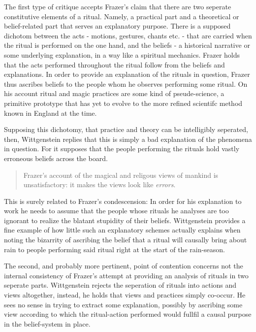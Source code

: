 \documentclass{article}
\begin{document}
The first type of critique accepts Frazer's claim that there are two seperate constitutive elements of a ritual. Namely, a practical part and a theoretical or belief-related part that serves an explanatory purpose. There is a supposed dichotom between the acts - motions, gestures, chants etc. - that are carried when the ritual is performed on the one hand, and the beliefs - a historical narrative or some underlying explanation, in a way like a spiritual mechanics. Frazer holds that the acts performed throughout the ritual follow from the beliefs and explanations. In order to provide an explanation of the rituals in question, Frazer thus ascribes beliefs to the people whom he observes performing some ritual. On his account ritual and magic practices are some kind of pseude-science, a primitive prototype that has yet to evolve to the more refined scientifc method known in England at the time. 

Supposing this dichotomy, that practice and theory can be intelligibly seperated, then, Wittgenstein replies that this is simply a bad explanation of the phenomena in question. For it supposes that the people performing the rituals hold vastly erroneous beliefs across the board.
\begin{quote}
Frazer's account of the magical and religous views of mankind is unsatisfactory: it makes the views look like \textit{errors}.
\end{quote} 
This is surely related to Frazer's condescension: In order for his explanation to work he needs to assume that the people whose rituals he analyses are too ignorant to realize the blatant stupidity of their beliefs. Wittgenstein provides a fine example of how little such an explanatory schemes actually explains when noting the bizarrity of ascribing the belief that a ritual will causally bring about rain to people performing said ritual right at the start of the rain-season.

The second, and probably more pertinent, point of contention concerns not the internal consistency of Frazer's attempt at providing an analysis of rituals in two seperate parts. Wittgenstein rejects the seperation of rituals into actions and views altogether, instead, he holds that views and practices simply co-occur. He sees no sense in trying to extract some explanation, possibly by ascribing some view according to which the ritual-action performed would fullfil a causal purpose in the belief-system in place.
\end{document}
